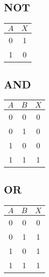 \subsection{NOT}

\begin{table}[H]
    \centering
    \begin{tabular}{|c|c|}
        \hline
        \cellcolor{gray!40} $A$ & \cellcolor{gray!40} $X$ \\
        \hline
        0 & 1 \\
        \hline
        1 & 0 \\
        \hline
    \end{tabular}
\end{table}

\subsection{AND}

\begin{table}[H]
    \centering
    \begin{tabular}{|c|c|c|}
        \hline
        \cellcolor{gray!40} $A$ & \cellcolor{gray!40} $B$ & \cellcolor{gray!40} $X$ \\
        \hline
        0 & 0 & 0 \\
        \hline
        0 & 1 & 0 \\
        \hline
        1 & 0 & 0 \\
        \hline
        1 & 1 & 1 \\
        \hline
    \end{tabular}
\end{table}

\subsection{OR}

\begin{table}[H]
    \centering
    \begin{tabular}{|c|c|c|}
        \hline
        \cellcolor{gray!40} $A$ & \cellcolor{gray!40} $B$ & \cellcolor{gray!40} $X$ \\
        \hline
        0 & 0 & 0 \\
        \hline
        0 & 1 & 1 \\
        \hline
        1 & 0 & 1 \\
        \hline
        1 & 1 & 1 \\
        \hline
    \end{tabular}
\end{table}

